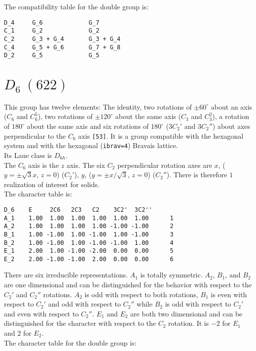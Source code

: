 \documentclass[12pt,a4paper,twoside]{report}
\begin{document}
The compatibility table for the double group is:

\begin{tcolorbox}
\begin{footnotesize}
\begin{verbatim}
D_4     G_6             G_7  
C_1     G_2             G_2   
C_2     G_3 + G_4       G_3 + G_4   
C_4     G_5 + G_6       G_7 + G_8
D_2     G_5             G_5
\end{verbatim}
\end{footnotesize}
\end{tcolorbox}

\newpage
{\color{coral}\section{$D_6\ (622)$}} 
\color{black}
This group has twelve elements: The identity, two rotations of 
$\pm60^\circ$ about an axis ($C_6$ and $C_6^5$), two rotations of 
$\pm120^\circ$ about the same axis
($C_3$ and $C_3^2$), a rotation of $180^\circ$ about the same axis and
six rotations of $180^\circ$ ($3C_2'$ and $3C_2''$) about axes perpendicular 
to the $C_6$ axis \texttt{[53]}. It is a group compatible with the 
hexagonal system and with the
hexagonal (\texttt{ibrav=4}) Bravais lattice. \\ 
Its Laue class is $D_{6h}$. \\
The $C_6$ axis is the $z$ axis. The six $C_2$ perpendicular rotation axes are
$x$, ($y=\pm\sqrt{3}x$, $z=0$) ($C_2'$), 
$y$, ($y=\pm x/\sqrt{3}$, $z=0$) ($C_2''$). There is therefore
$1$ realization of interest for solids. \\
The character table is:

\begin{tcolorbox}
\begin{footnotesize}
\begin{verbatim}
D_6    E     2C6   2C3   C2    3C2'  3C2''
A_1    1.00  1.00  1.00  1.00  1.00  1.00      1
A_2    1.00  1.00  1.00  1.00 -1.00 -1.00      2
B_1    1.00 -1.00  1.00 -1.00  1.00 -1.00      3
B_2    1.00 -1.00  1.00 -1.00 -1.00  1.00      4
E_1    2.00  1.00 -1.00 -2.00  0.00  0.00      5
E_2    2.00 -1.00 -1.00  2.00  0.00  0.00      6
\end{verbatim}
\end{footnotesize}
\end{tcolorbox}

There are six irreducible representations. $A_1$ is totally symmetric.
$A_2$, $B_1$, and $B_2$ are one dimensional and can be distinguished for the
behavior with respect to the $C_2'$ and $C_2''$ rotations. $A_2$ is odd 
with respect to both rotations, $B_1$ is even with respect to $C_2'$ and 
odd with respect to $C_2''$ while $B_2$ is odd with respect to $C_2'$ and
even with respect to $C_2''$. $E_1$ and $E_2$ are both two dimensional and
can be distinguished for the character with respect to the $C_2$ 
rotation. It is $-2$ for $E_1$ and $2$ for $E_2$. \\
The character table for the double group is:
\end{document}
